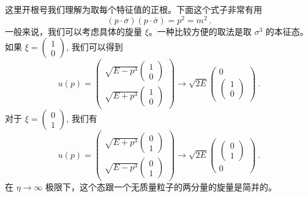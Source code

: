 这里开根号我们理解为取每个特征值的正根。下面这个式子非常有用
\begin{equation}
(p\cdot\sigma)(p\cdot \bar\sigma) = p^2 = m^2~.
\end{equation}
一般来说，我们可以考虑具体的旋量 $\xi$。一种比较方便的取法是取 $\sigma^3$ 的本征态。如果 $\xi=\begin{pmatrix}
1 \\ 0
\end{pmatrix}$, 我们可以得到
\begin{equation}\label{diracs_eq2}
u(p) = \begin{pmatrix}
\sqrt{E-p^3}\begin{pmatrix}
1 \\ 0 
\end{pmatrix} \\
\sqrt{E+p^3}\begin{pmatrix}
1 \\ 0
\end{pmatrix}
\end{pmatrix} \rightarrow \sqrt{2E}\begin{pmatrix}
0  \\ 
\begin{pmatrix}
1 \\ 0
\end{pmatrix}
\end{pmatrix}~.
\end{equation}
对于 $\xi = \begin{pmatrix}
0 \\ 1
\end{pmatrix}$, 
我们有
\begin{equation}\label{diracs_eq3}
u(p) = \begin{pmatrix}
\sqrt{E+p^3}\begin{pmatrix}
0 \\ 1 
\end{pmatrix} \\
\sqrt{E-p^3}\begin{pmatrix}
0 \\ 1
\end{pmatrix}
\end{pmatrix} \rightarrow \sqrt{2E}\begin{pmatrix}
\begin{pmatrix}
0 \\ 1
\end{pmatrix}  \\ 
0
\end{pmatrix}~.
\end{equation}
在 $\eta\rightarrow \infty$ 极限下，这个态跟一个无质量粒子的两分量的旋量是简并的。

